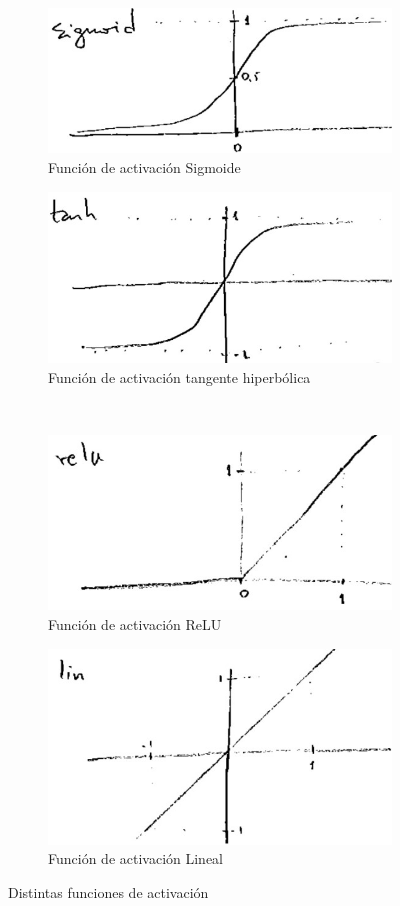 \begin{figure}
\begin{subfigure}{0.5\textwidth}
    \centering
    \includegraphics[width=.7\textwidth]{img/img007func_act_sigmoid.jpg}
    \caption{Función de activación Sigmoide}
    \label{fig:sigmoide}
\end{subfigure}
\begin{subfigure}{0.5\textwidth}
    \centering
    \includegraphics[width=.7\textwidth]{img/img008func_act_tanh.jpg}
    \caption{Función de activación tangente hiperbólica}
    \label{fig:tanh}
\end{subfigure}\\
\begin{subfigure}{0.5\textwidth}
    \centering
    \includegraphics[width=.7\textwidth]{img/img009func_act_relu.jpg}
    \caption{Función de activación ReLU}
    \label{fig:relu}
\end{subfigure}
\begin{subfigure}{0.5\textwidth}
    \centering
    \includegraphics[width=.7\textwidth]{img/img010func_act_lin.jpg}
    \caption{Función de activación Lineal}
    \label{fig:lin}
\end{subfigure}
\caption{Distintas funciones de activación}
\label{fig:act-func}
\end{figure}

